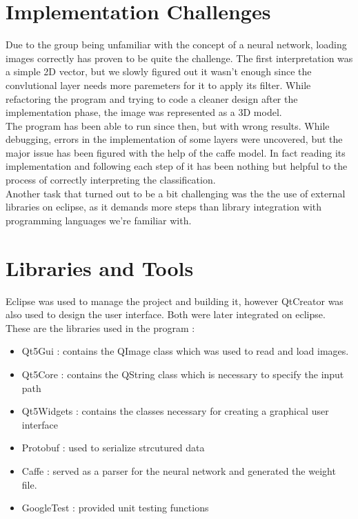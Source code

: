 \documentclass[parskip=full]{scrartcl}
\begin{document}
\section {Implementation Challenges}
Due to the group being unfamiliar with the concept of a neural network, loading images correctly has proven to be quite the challenge. The first interpretation was a simple 2D vector, but we slowly figured out it wasn't enough since the convlutional layer needs more paremeters for it to apply its filter. While refactoring the program and trying to code a cleaner design after the implementation phase, the image was represented as a 3D model.
\\ The program has been able to run since then, but with wrong results. While debugging, errors in the implementation of some  layers were uncovered, but the major issue has been figured with the help of the caffe model. In fact reading its implementation and following each step of it has been nothing but helpful to the process of correctly interpreting the classification. \\
Another task that turned out to be a bit challenging was the the use of external libraries on eclipse, as it demands more steps than library integration with programming languages we're familiar with. 

\section {Libraries and Tools}
Eclipse was used to manage the project and building it, however QtCreator was also used to design the user interface. Both were later integrated on eclipse. \\
These are the libraries used in the program :

\begin{itemize}
	\item Qt5Gui : contains the QImage class which was used to read and load images.
	\item Qt5Core : contains the QString class which is necessary to specify the input path 
	\item Qt5Widgets : contains the classes necessary for creating a graphical user interface 
	\item Protobuf : used to serialize strcutured data 
	\item Caffe : served as a parser for the neural network and generated the weight file.
	\item GoogleTest : provided unit testing functions
\end{itemize}
\end{document}
